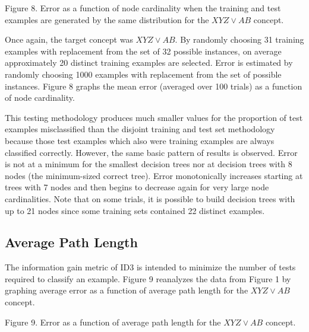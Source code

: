 \vspace*{0.0cm}
\hspace{0.6cm}
\centerline{}

\vspace{0.2cm}
\parindent 0.0cm
Figure 8. Error as a function of node cardinality when the training 
and test examples are generated by the same distribution for the 
$XYZ \vee AB$ concept.\\
\parindent 0.6cm
\parskip 0.0cm

Once again, the target concept was
$XYZ \vee AB$.  By randomly choosing 31 training examples with
replacement from the set of 32 possible instances, on average
approximately 20 distinct training examples are selected.  Error is
estimated by randomly choosing 1000 examples with replacement from the
set of possible instances.  Figure 8 graphs the mean error (averaged
over 100 trials) as a function of node cardinality.

This testing methodology produces much smaller values for the
proportion of test examples misclassified than the disjoint training
and test set methodology because those test examples which also were
training examples are always classified correctly.  However, the same
basic pattern of results is observed.  Error is not at a minimum for
the smallest decision trees nor at decision trees with 8 nodes (the
minimum-sized correct tree).  Error monotonically increases starting
at trees with 7 nodes and then begins to decrease again for very
large node cardinalities.  Note that on some trials, it is possible to
build decision trees with up to 21 nodes since some training sets
contained 22 distinct examples.

\subsection{Average Path Length}

The information gain metric of ID3 is intended to minimize the number
of tests required to classify an example. Figure 9 reanalyzes the
data from Figure 1 by graphing average error as a function of average
path length for the $XYZ \vee AB$ concept.  

\vspace*{0.3cm}
\hspace{0.95cm}
\centerline{}

\vspace{0.2cm}
\parindent 0.0cm
\begin{center}
Figure 9. Error as a function of average path length for the 
$XYZ \vee AB$ concept.\\
\end{center}
\parindent 0.6cm
\parskip 0.0cm

